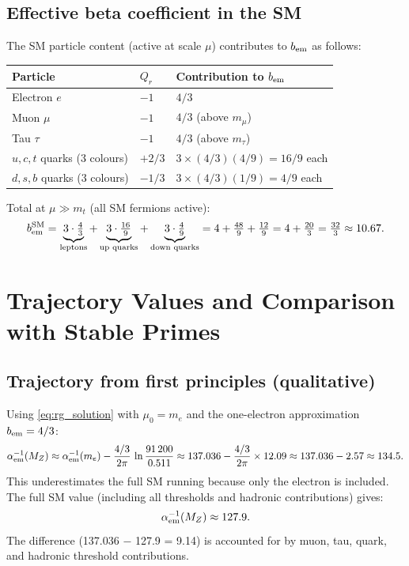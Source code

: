 \documentclass[12pt,a4paper]{article}
\theoremstyle{definition}
\theoremstyle{remark}
\begin{document}
\subsection{Effective beta coefficient in the SM}

The SM particle content (active at scale $\mu$) contributes to
$b_{\rm em}$ as follows:

\begin{center}
\begin{tabular}{lll}
\toprule
Particle & $Q_r$ & Contribution to $b_{\rm em}$ \\
\midrule
Electron $e$ & $-1$ & $4/3$ \\
Muon $\mu$ & $-1$ & $4/3$ (above $m_\mu$) \\
Tau $\tau$ & $-1$ & $4/3$ (above $m_\tau$) \\
$u,c,t$ quarks (3 colours) & $+2/3$ & $3 \times (4/3)(4/9) = 16/9$ each \\
$d,s,b$ quarks (3 colours) & $-1/3$ & $3 \times (4/3)(1/9) = 4/9$ each \\
\bottomrule
\end{tabular}
\end{center}

Total at $\mu \gg m_t$ (all SM fermions active):
\[
  b_{\rm em}^{\rm SM}
  = \underbrace{3\cdot\tfrac{4}{3}}_{\text{leptons}}
  + \underbrace{3\cdot\tfrac{16}{9}}_{\text{up quarks}}
  + \underbrace{3\cdot\tfrac{4}{9}}_{\text{down quarks}}
  = 4 + \tfrac{48}{9} + \tfrac{12}{9}
  = 4 + \tfrac{20}{3}
  = \tfrac{32}{3} \approx 10.67.
\]

\section{Trajectory Values and Comparison with Stable Primes}

\subsection{Trajectory from first principles (qualitative)}

Using \eqref{eq:rg_solution} with $\mu_0 = m_e$ and the one-electron
approximation $b_{\rm em} = 4/3$:
\[
  \alpha_{\rm em}^{-1}(M_Z)
  \approx \alpha_{\rm em}^{-1}(m_e)
  - \frac{4/3}{2\pi}\,\ln\frac{91\,200}{0.511}
  \approx 137.036 - \frac{4/3}{2\pi} \times 12.09
  \approx 137.036 - 2.57
  \approx 134.5.
\]
This underestimates the full SM running because only the electron is included.
The full SM value (including all thresholds and hadronic contributions) gives:
\[
  \alpha_{\rm em}^{-1}(M_Z) \approx 127.9.
\]
The difference (137.036 − 127.9 = 9.14) is accounted for by muon, tau,
quark, and hadronic threshold contributions.
\end{document}
